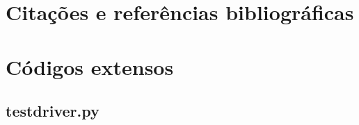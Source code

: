 \documentclass[12pt,a4paper,twoside]{report}
\begin{document}
\chapter{Citações e referências bibliográficas}








\clearpage
{}
\appendix

\chapter{Códigos extensos \label{ap:testdriver}}
\section{testdriver.py}

\end{document}
